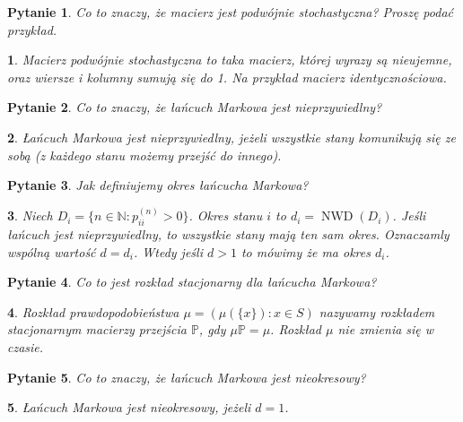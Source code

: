 \documentclass[10pt]{mwart}
\theoremstyle{plain}
\newtheorem{pytanie}{Pytanie}
\theoremstyle{break}
\newtheorem*{odpowiedź}{}
\begin{document}
\begin{pytanie}
Co to znaczy, że macierz jest podwójnie stochastyczna? Proszę podać przykład.
\end{pytanie}
\begin{odpowiedź}
    Macierz podwójnie stochastyczna to taka macierz,
    której wyrazy są nieujemne, oraz
    wiersze i kolumny sumują się do 1.
    Na przykład macierz identycznościowa.
\end{odpowiedź}


\begin{pytanie}
Co to znaczy, że łańcuch Markowa jest nieprzywiedlny?
\end{pytanie}
\begin{odpowiedź}
    Łańcuch Markowa jest nieprzywiedlny, jeżeli wszystkie
    stany komunikują się ze sobą (z każdego stanu
    możemy przejść do innego).
\end{odpowiedź}


\begin{pytanie}
Jak definiujemy okres łańcucha Markowa?
\end{pytanie}
\begin{odpowiedź}
    Niech $D_i = \{n \in \mathbb{N}: p_{ii}^{(n)} > 0 \}$.
    Okres stanu $i$ to $d_i=\operatorname{NWD}(D_i)$.
    Jeśli łańcuch jest nieprzywiedlny, to wszystkie stany mają ten
    sam okres. Oznaczamly wspólną wartość $d = d_i$.
    Wtedy jeśli $d > 1$ to mówimy że ma okres $d_i$.
\end{odpowiedź}


\begin{pytanie}
Co to jest rozkład stacjonarny dla łańcucha Markowa?
\end{pytanie}
\begin{odpowiedź}
    Rozkład prawdopodobieństwa $\mu = (\mu (\{x\}) : x\in S)$
    nazywamy rozkładem stacjonarnym macierzy przejścia $\mathbb{P}$,
    gdy $\mu \mathbb{P} = \mu$.
    Rozkład $\mu$ nie zmienia się w czasie.
\end{odpowiedź}


\begin{pytanie}
Co to znaczy, że łańcuch Markowa jest nieokresowy?
\end{pytanie}
\begin{odpowiedź}
    Łańcuch Markowa jest nieokresowy, jeżeli $d=1$.
\end{odpowiedź}
\end{document}

